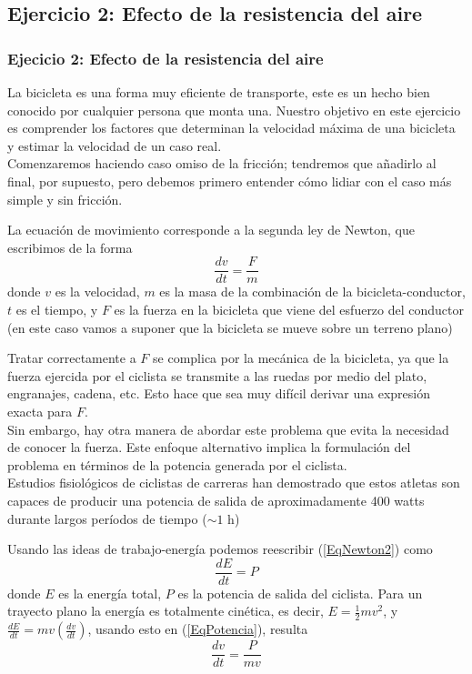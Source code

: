 \subsection{Ejercicio 2: Efecto de la resistencia del aire}
\begin{frame}
\frametitle{Ejecicio 2: Efecto de la resistencia del aire}
La bicicleta es una forma muy eficiente de transporte, este es un hecho bien conocido por cualquier persona que monta una. Nuestro objetivo en este ejercicio es comprender los factores que determinan la velocidad máxima de una bicicleta y estimar la velocidad de un caso real.
\\
\bigskip
Comenzaremos haciendo caso omiso de la fricción; tendremos que añadirlo al final, por supuesto, pero debemos primero entender cómo lidiar con el caso más simple y sin fricción.
\end{frame}
\begin{frame}
La ecuación de movimiento corresponde a la segunda ley de Newton, que escribimos de la forma
\begin{equation}\label{EqNewton2}
\dfrac{dv}{dt} = \dfrac{F}{m}
\end{equation}
donde $v$ es la velocidad, $m$ es la masa de la combinación de la bicicleta-conductor, $t$ es el tiempo, y $F$ es la fuerza en la bicicleta que viene del esfuerzo del conductor (en este caso vamos a suponer que la bicicleta se mueve sobre un terreno plano)
\end{frame}
\begin{frame}
Tratar correctamente a $F$ se complica por la mecánica de la bicicleta, ya que la fuerza ejercida por el ciclista se transmite a las ruedas por medio del plato, engranajes, cadena, etc. Esto hace que sea muy difícil derivar una expresión exacta para $F$.
\\
\medskip
Sin embargo, hay otra manera de abordar este problema que evita la necesidad de conocer la fuerza. Este enfoque alternativo implica la formulación del problema en términos de la potencia generada por el ciclista.
\\
\medskip
Estudios fisiológicos de ciclistas de carreras han demostrado que estos atletas son capaces de producir una potencia de salida de aproximadamente 400 watts durante largos períodos de tiempo ($\sim 1$ h)
\end{frame}
\begin{frame}
Usando las ideas de trabajo-energía podemos reescribir (\ref{EqNewton2}) como
\begin{equation}\label{EqPotencia}
\dfrac{dE}{dt} = P
\end{equation}
donde $E$ es la energía total, $P$ es la potencia de salida del ciclista. Para un trayecto plano la energía es totalmente cinética, es decir, $E = \frac{1}{2} m v^{2}$, y $\frac{dE}{dt} = mv (\frac{dv}{dt})$, usando esto en (\ref{EqPotencia}), resulta
\begin{equation}\label{EqPotenciavel}
\dfrac{dv}{dt} = \dfrac{P}{mv}
\end{equation}
\end{frame}
